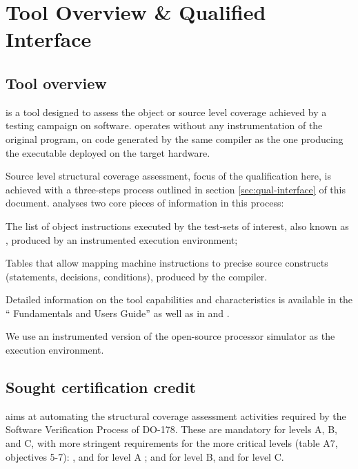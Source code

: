 \documentclass {report}
\begin{document}
\chapter{Tool Overview \& Qualified Interface}

\section{Tool overview}

\xcov{} is a tool designed to assess the object or source level coverage
achieved by a testing campaign on software.
%
\xcov{} operates without any instrumentation of the original program, on
code generated by the same compiler as the one producing the executable
deployed on the target hardware.

Source level structural coverage assessment, focus of the qualification here,
is achieved with a three-steps process outlined in section
\ref{sec:qual-interface} of this document.
%
\xcov{} analyses two core pieces of information in this process:

\begin{Itemize}
%
\item The list of object instructions executed by the test-sets of interest,
  also known as , produced by an instrumented execution
  environment;
%
\item Tables that allow mapping machine instructions to precise source
  constructs (statements, decisions, conditions), produced by the compiler.
\end{Itemize}

Detailed information on the tool capabilities and characteristics is available
in the ``\xcov{} Fundamentals and Users Guide'' as well as in \adae{} and
\erts{}.

We use an instrumented version of the \qemu{} open-source processor simulator
as the execution environment.

\section {Sought certification credit}

\xcov{} aims at automating the structural coverage assessment activities
required by the Software Verification Process of DO-178.
%
These  are mandatory for levels A, B, and C, with more stringent
requirements for the more critical levels (table A7, objectives 5-7): \mcdc{},
\dc{} and \stc{} for level A ; \dc{} and \stc{} for level B, and \stc{} for
 level C.
\end{document}
